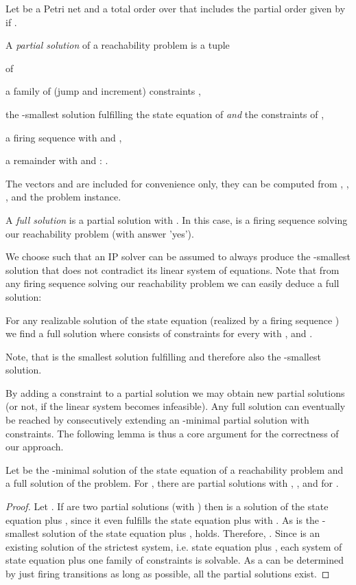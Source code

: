 \documentclass{LMCS}
\begin{document}
\begin{defi}
Let  be a Petri net and  a total order over  that includes the partial order given by
 if . 

\noindent A {\em partial solution} of a reachability problem 
 is a 
tuple 
 
of
\begin{iteMize}{}
\item a family of (jump and increment) constraints ,
\item the -smallest solution  fulfilling the state equation of  {\em and} the constraints of ,
\item a firing sequence  with  and ,
\item a remainder  with  and : .
\end{iteMize}
The vectors  and  are included for convenience only, they can be computed from , , , and the problem instance.

A {\em full solution} is a partial solution  with . In this case,  is a firing
sequence solving our reachability problem (with answer 'yes').
\end{defi}

We choose  such that an IP solver can be assumed to always 
produce the -smallest solution that does not contradict its linear system of equations.
Note that from any firing sequence solving our reachability problem we can easily deduce a full solution:

\begin{cor}
For any realizable solution  of the state equation (realized by a firing sequence )
we find a full solution 
where  consists of constraints  for every  with , and .
\end{cor}
Note, that  is the smallest solution fulfilling  and therefore also the -smallest solution.

By adding a constraint to a partial solution we may obtain new partial solutions (or not, if the linear
system becomes infeasible). Any full solution can eventually be reached by consecutively extending an -minimal 
partial solution with constraints. The following lemma is thus a core argument for the correctness of our approach.

\begin{lem}\label{L.PTFL}
Let  be the -minimal solution of the state equation of a reachability problem  and 
 a full solution of the problem. 
For , there are partial solutions 
with , , and  for .
\end{lem}
\begin{proof}
Let .
If  are two partial solutions (with ) then  is a solution
of the state equation plus , since it even fulfills the state equation plus  with .
As  is the -smallest solution of the state equation plus ,  holds.
Therefore, . Since  is an existing solution of the
strictest system, i.e. state equation plus , each system of state equation plus one family of constraints 
is solvable. As a  can be determined by just firing transitions as long as possible, all the partial
solutions  exist.
\end{proof}
\end{document}
